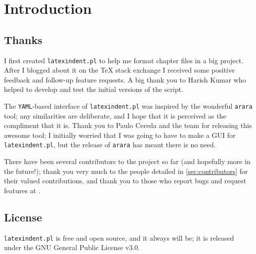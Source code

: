 \section{Introduction}
\subsection{Thanks}
	I first created \texttt{latexindent.pl} to help me format chapter files
	in a big project. After I blogged about it on the
	\TeX{} stack exchange \cite{cmhblog} I received some positive feedback and
	follow-up feature requests. A big thank you to Harish Kumar \cite{harish} who
	helped to develop and test the initial versions of the script.

	The \texttt{YAML}-based interface of \texttt{latexindent.pl} was inspired
	by the wonderful \texttt{arara} tool; any similarities are deliberate, and
	I hope that it is perceived as the compliment that it is. Thank you to Paulo Cereda and the
	team for releasing this awesome tool; I initially worried that I was going to
	have to make a GUI for \texttt{latexindent.pl}, but the release of \texttt{arara}
	has meant there is no need.

	There have been several contributors to the project so far (and hopefully more in
	the future!); thank you very much to the people detailed in \vref{sec:contributors}
	for their valued contributions, and thank you to those who report bugs and request features
	at \cite{latexindent-home}.

\subsection{License}
	\texttt{latexindent.pl} is free and open source, and it always will be; it
	is released under the GNU General Public License v3.0.

